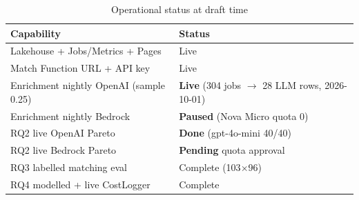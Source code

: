 \begin{table}[ht]
\centering
\caption{Operational status at draft time}
\label{tab:status}
\begin{tabularx}{\textwidth}{@{}lX@{}}
\toprule
\textbf{Capability} & \textbf{Status} \\
\midrule
Lakehouse + Jobs/Metrics + Pages & Live \\
Match Function URL + API key & Live \\
Enrichment nightly OpenAI (sample 0.25) & \textbf{Live} (304 jobs $\rightarrow$ 28 LLM rows, 2026-10-01) \\
Enrichment nightly Bedrock & \textbf{Paused} (Nova Micro quota 0) \\
RQ2 live OpenAI Pareto & \textbf{Done} (gpt-4o-mini 40/40) \\
RQ2 live Bedrock Pareto & \textbf{Pending} quota approval \\
RQ3 labelled matching eval & Complete (103$\times$96) \\
RQ4 modelled + live CostLogger & Complete \\
\bottomrule
\end{tabularx}
\end{table}
